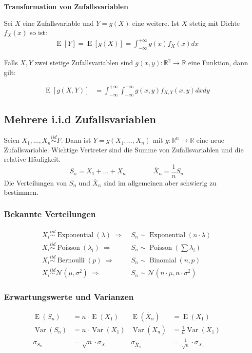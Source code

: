 \documentclass[25pt]{sciposter}
\newcommand{\R}{\mathbb{R}}
\newcommand{\Var}{\operatorname{Var}}
\newcommand{\E}{\operatorname{E}}
\newcommand{\mc}{\mathcal}
\newenvironment{thm}[1]{\begin{mdframed}[backgroundcolor=pink!20,innertopmargin=15pt, innerbottommargin=15pt, nobreak=true]
		\textbf{#1 }
	}
	{ 
	\end{mdframed}
}
\begin{document}
\begin{multicols}{3}
\begin{thm}{Transformation von Zufallsvariablen}
	Sei $X$ eine Zufallsvariable und $Y=g(X)$ eine weitere. Ist $X$ stetig mit Dichte $f_X(x)$ so ist:
	\begin{align*}
		\E[Y] = \E[g(X)] = \int_{-\infty}^{+\infty} g(x) f_X(x) dx
	\end{align*}
	
	Falls $X,Y$ zwei stetige Zufallsvariablen sind $g(x,y) : \R^2 \to \R$ eine Funktion, dann gilt:
	
	\begin{align*}
		\E[g(X,Y)] &= \int_{-\infty}^{+\infty} \int_{-\infty}^{+\infty} g(x,y) f_{X,Y}(x,y) dx dy
	\end{align*}
	
\end{thm}




\subsection*{Mehrere i.i.d Zufallsvariablen}

Seien $X_1,\ldots,X_n \overset{iid}{\sim} F$. Dann ist $Y=g(X_1,\ldots,X_n)$ mit $g: \R^n \longrightarrow \R$ eine neue Zufallsvariable.
Wichtige Vertreter sind die Summe von Zufallsvariablen und die relative Häufigkeit.
\[ S_n = X_1 + \ldots + X_n \qquad \qquad\overline{X}_n = \dfrac{1}{n} S_n \]
Die Verteilungen von $S_n$ und $\overline X_n$ sind im allgemeinen aber schwierig zu bestimmen.

\subsubsection*{Bekannte Verteilungen}
\begin{align*}
X_i \overset{iid}{\sim} \operatorname{Exponential}(\lambda) \; \Rightarrow & \; S_n \sim \operatorname{Exponential}(n\cdot \lambda) \\
X_i \overset{iid}{\sim} \operatorname{Poisson}(\lambda_i) \; \Rightarrow & \; S_n \sim \operatorname{Poisson}({\textstyle \sum \lambda_i}) \\
X_i \overset{iid}{\sim} \operatorname{Bernoulli}(p) \; \Rightarrow & \; S_n \sim \operatorname{Binomial}(n,p)\\
X_i \overset{iid}{\sim} \mc N(\mu, \sigma^2) \; \Rightarrow & \; S_n \sim \mc N(n \cdot \mu, n \cdot \sigma^2)
\end{align*}
\subsubsection*{Erwartungswerte und Varianzen}
\begin{align*}
\E(S_n) &= n \cdot \E(X_1) & \E(\overline{X}_n) &= \E(X_1) \\
\Var(S_n) &= n \cdot \Var(X_1) & \Var(\overline{X}_n) &= \tfrac{1}{n} \Var(X_1) \\
\sigma_{S_n} &= \sqrt{n} \cdot \sigma_{X_1} & \sigma_{\overline{X}_n} &= \tfrac{1}{\sqrt{n}} \cdot \sigma_{X_1}
\end{align*}




\end{multicols}
\end{document}
